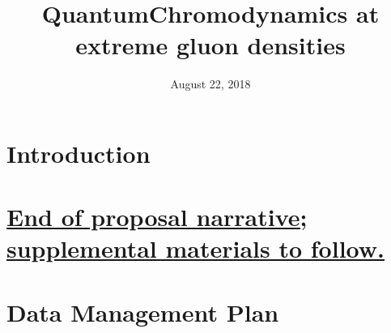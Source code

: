 \documentclass{DOEproposal}
\institute{North Carolina State University}
\title{QuantumChromodynamics at extreme gluon densities}
\date{August 22, 2018}
\renewcommand*{\maketitle}{}
\begin{document}
    \maketitle

    \renewcommand{\contentsname}{Table of Contents}
    \tableofcontents
    \newpage

    \setcounter{page}{1}
    \section{Introduction}
    
    \newpage



    
    
    
    





    
		\vspace{1em}
    \section*{\underline{End of proposal narrative; supplemental materials to follow.}}
    \newpage


    
	    \section{Data Management Plan}
        \label{sec:data_management}
        
	\newpage 
\end{document}
